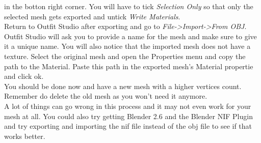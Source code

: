 in the botton right corner. You will have to tick \textit{Selection Only} so that only the selected mesh gets exported and untick \textit{Write Materials}.\\
Return to Outfit Studio after exporting and go to \textit{File->Import->From OBJ}. Outfit Studio will ask you to provide a name for the 
mesh and make sure to give it a unique name. You will also notice that the imported mesh does not have a texture. Select the original 
mesh and open the Properties menu and copy the path to the Material. Paste this path in the exported mesh's Material propertie and click ok.\\
You should be done now and have a new mesh with a higher vertices count. Remember do delete the old mesh as you won't need it anymore.\\
A lot of things can go wrong in this process and it may not even work for your mesh at all. You could also try getting Blender 2.6 and the 
Blender NIF Plugin and try exporting and importing the nif file instead of the obj file to see if that works better.